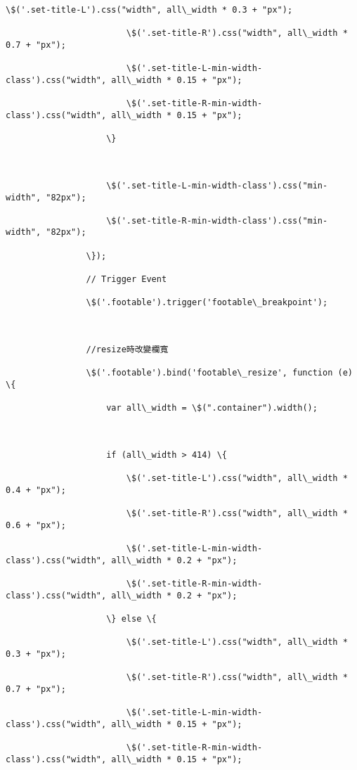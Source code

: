 \documentclass[11pt]{article}
\begin{document}
\begin{Verbatim}[commandchars=\\\{\}]
                        \$('.set-title-L').css("width", all\_width * 0.3 + "px");

                        \$('.set-title-R').css("width", all\_width * 0.7 + "px");

                        \$('.set-title-L-min-width-class').css("width", all\_width * 0.15 + "px");

                        \$('.set-title-R-min-width-class').css("width", all\_width * 0.15 + "px");

                    \}



                    \$('.set-title-L-min-width-class').css("min-width", "82px");

                    \$('.set-title-R-min-width-class').css("min-width", "82px");

                \});

                // Trigger Event

                \$('.footable').trigger('footable\_breakpoint');



                //resize時改變欄寬

                \$('.footable').bind('footable\_resize', function (e) \{

                    var all\_width = \$(".container").width();



                    if (all\_width > 414) \{

                        \$('.set-title-L').css("width", all\_width * 0.4 + "px");

                        \$('.set-title-R').css("width", all\_width * 0.6 + "px");

                        \$('.set-title-L-min-width-class').css("width", all\_width * 0.2 + "px");

                        \$('.set-title-R-min-width-class').css("width", all\_width * 0.2 + "px");

                    \} else \{

                        \$('.set-title-L').css("width", all\_width * 0.3 + "px");

                        \$('.set-title-R').css("width", all\_width * 0.7 + "px");

                        \$('.set-title-L-min-width-class').css("width", all\_width * 0.15 + "px");

                        \$('.set-title-R-min-width-class').css("width", all\_width * 0.15 + "px");


\end{Verbatim}
\end{document}
